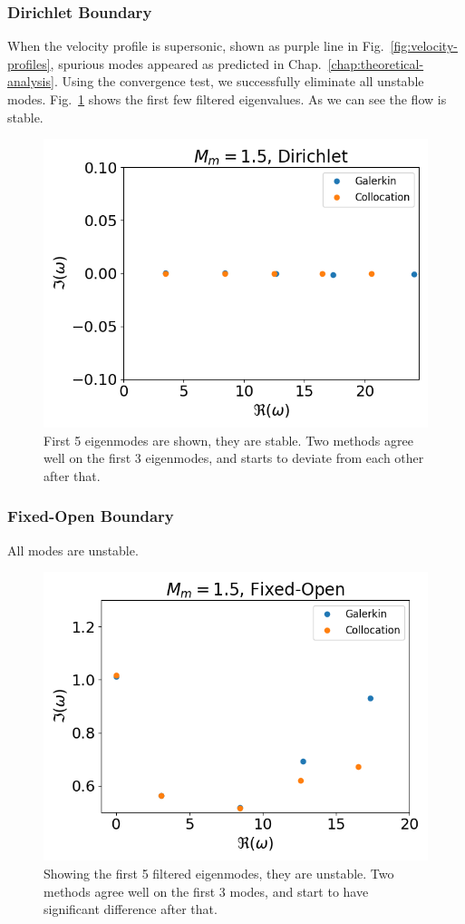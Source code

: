 \subsubsection*{Dirichlet Boundary}
When the velocity profile is supersonic, shown as purple line in Fig.~\ref{fig:velocity-profiles}, spurious modes appeared as predicted in Chap.~\ref{chap:theoretical-analysis}. Using the convergence test, we successfully eliminate all unstable modes. Fig.~\ref{fig:supersonic-dirichlet} shows the first few filtered eigenvalues. As we can see the flow is stable.
\begin{figure} [H]
	\centering
	\includegraphics[width=0.7\linewidth]{figures/supersonic-drichlet.png}
	\caption{First 5 eigenmodes are shown, they are stable. Two methods agree well on the first 3 eigenmodes, and starts to deviate from each other after that.}
	\label{fig:supersonic-dirichlet}
\end{figure}

\subsubsection*{Fixed-Open Boundary}
All modes are unstable.
\begin{figure} [H]
	\centering
	\includegraphics[width=0.7\linewidth]{figures/supersonic-fixed-open.png}
	\caption{Showing the first 5 filtered eigenmodes, they are unstable. Two methods agree well on the first 3 modes, and start to have significant difference after that.}
	\label{fig:supersonic-fixed-open}
\end{figure}


